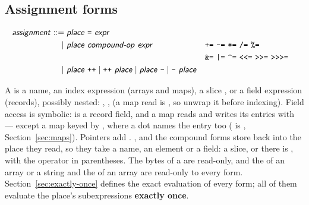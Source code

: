 \subsection*{Assignment forms}

\begin{align*}
\ty{assignment} ::={}& \ty{place}~\ic{=}~\ty{expr} \\
  |~& \ty{place}~\ty{compound-op}~\ty{expr}
     && \ic{+=}~\ic{-=}~\ic{*=}~\ic{/=}~\ic{\%=} \\
  &&& \ic{\&=}~\ic{|=}~\ic{\textasciicircum{}=}~\ic{<{}<=}~\ic{>{}>=}~\ic{>{}>{}>=} \\
  |~& \ty{place}~\ic{++} \mid \ic{++}~\ty{place}
   \mid \ty{place}~\ic{--} \mid \ic{--}~\ty{place}
\end{align*}

\noindent A  is a name, an index expression  (arrays
and maps), a slice , or a field expression 
(records), possibly nested: , ,
 (a map read is , so unwrap it before indexing).
Field access is
symbolic:  is a record field, and a map reads and writes its
entries with  --- except a map keyed by , where a dot
names the entry too ( is , Section~\ref{sec:maps}).
Pointers add .
\ic{++}, \ic{--} and the compound forms store back into the place they
read, so they take a name, an element or a field: a slice,  or
 there is , with the
operator in parentheses. The bytes of a  are read-only, and the
 of an array or a string and the  of an array are
read-only to every form.
Section~\ref{sec:exactly-once} defines the exact evaluation of every
form; all of them evaluate the place's subexpressions \textbf{exactly
once}.
